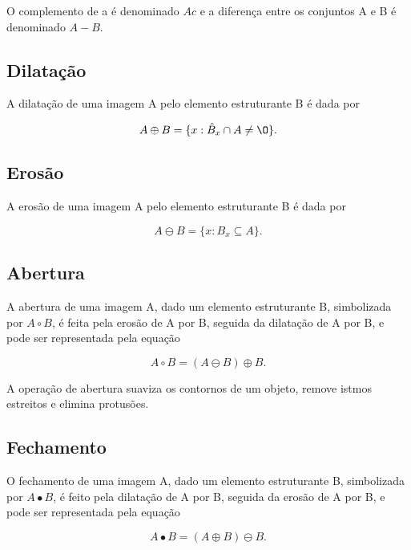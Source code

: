 O complemento de a é denominado $Ac$ e a diferença entre os conjuntos A e B é denominado $A-B.$

\subsection{Dilatação}
\label{sec:dilatacao}

A dilatação de uma imagem A pelo elemento estruturante B é dada por

\begin{displaymath}
A \oplus B = \{x : {\hat{B}}_x \cap A \neq \O \}. 
\end{displaymath}

\subsection{Erosão}
\label{sec:erosao}

A erosão de uma imagem A pelo elemento estruturante B é dada por

\begin{displaymath}
A \ominus B = \{ x : B_x \subseteq A \}. 
\end{displaymath}


\subsection{Abertura}
\label{sec:abertura}

A abertura de uma imagem A, dado um elemento estruturante B, simbolizada por $A \circ B$, é feita pela erosão de A por B, seguida da dilatação de A por B, e pode ser representada pela equação

\begin{displaymath}
A \circ B = (A \ominus B)\oplus B. 
\end{displaymath}

A operação de abertura suaviza os contornos de um objeto, remove istmos estreitos e elimina protusões.\cite{gonzalez1977digital}

\subsection{Fechamento}
\label{sec:fechamento}

O fechamento de uma imagem A, dado um elemento estruturante B, simbolizada por $A \bullet B$, é feito pela dilatação de A por B, seguida da erosão de A por B, e pode ser representada pela equação

\begin{displaymath}
A \bullet B = (A \oplus B)\ominus B. 
\end{displaymath}

